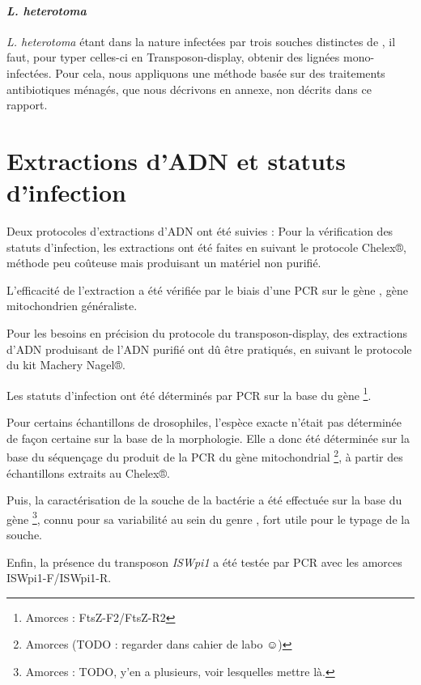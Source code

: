	\paragraph{\textit{L. heterotoma}} %
	\label{par:hetero_mm}
	\textit{L. heterotoma} étant dans la nature infectées par trois souches distinctes de , il faut, pour typer celles-ci en Transposon-display, obtenir des lignées mono-infectées. Pour cela, nous appliquons une méthode basée sur des traitements antibiotiques ménagés, que nous décrivons en annexe, non décrits dans ce rapport.


\section{Extractions d'ADN et statuts d'infection} %
	Deux protocoles d'extractions d'ADN ont été suivies : 
	Pour la vérification des statuts d'infection, les extractions ont été faites en suivant le protocole Chelex®, méthode peu coûteuse mais produisant un matériel non purifié.

	L'efficacité de l'extraction a été vérifiée par le biais d'une PCR sur le gène , gène mitochondrien généraliste.

	Pour les besoins en précision du protocole du transposon-display, des extractions d'ADN produisant de l'ADN purifié ont dû être pratiqués, en suivant le protocole du kit Machery Nagel®.

	Les statuts d'infection ont été déterminés par PCR sur la base du gène \footnote{Amorces : FtsZ-F2/FtsZ-R2}.

	Pour certains échantillons de drosophiles, l'espèce exacte n'était pas déterminée de façon certaine sur la base de la morphologie. Elle a donc été déterminée sur la base du séquençage du produit de la PCR du gène mitochondrial \footnote{Amorces (TODO : regarder dans cahier de labo ☺)}, à partir des échantillons extraits au Chelex®.

	Puis, la caractérisation de la souche de la bactérie a été effectuée sur la base du gène \footnote{Amorces : TODO, y’en a plusieurs, voir lesquelles mettre là.}, connu pour sa variabilité au sein du genre , fort utile pour le typage de la souche.

	Enfin, la présence du transposon \textit{ISWpi1} a été testée par PCR avec les amorces ISWpi1-F/ISWpi1-R.

